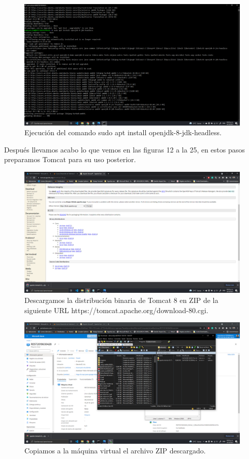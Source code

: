 \documentclass[11pt]{article}
\begin{document}
		\begin{figure}[H]
			\centering
			\includegraphics[scale=0.34]{resources/p2.2.png}
			\caption{Ejecución del comando sudo apt install openjdk-8-jdk-headless.}	\label{fig:picture}
		\end{figure}
		Después llevamos acabo lo que vemos en las figuras 12 a la 25, en estos pasos preparamos Tomcat para su uso posterior.
		\begin{figure}[H]
			\centering
			\includegraphics[scale=0.34]{resources/p3.png}
			\caption{Descargamos la distribución binaria de Tomcat 8 en ZIP de la siguiente URL https://tomcat.apache.org/download-80.cgi.}\label{fig:picture}
		\end{figure}
		\begin{figure}[H]
			\centering
			\includegraphics[scale=0.34]{resources/p4.1.png}
			\caption{Copiamos a la máquina virtual el archivo ZIP descargado.}\label{fig:picture}
		\end{figure}
\end{document}
